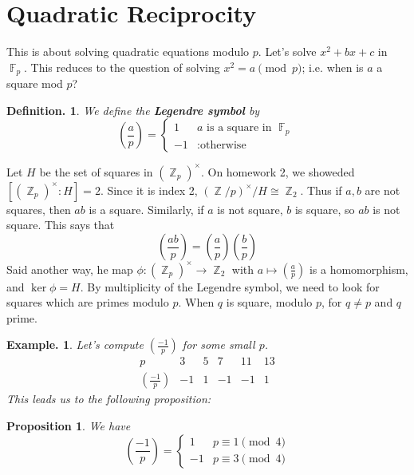 \documentclass[11pt, a4paper]{memoir}
\DeclareMathOperator{\Z}{{\mathbb{Z}}}
\DeclareMathOperator{\F}{{\mathbb{F}}}
\theoremstyle{change}
\newtheorem{proposition}[theorem]{Proposition}
\theoremstyle{plain}
\theoremstyle{nonumberplain}
\newtheorem{definition}{Definition.}
\newtheorem{example}{Example.}
\newcommand{\lgs}[2]{\ensuremath{\left(\frac{#1}{#2}\right)}}
\begin{document}
\section{Quadratic Reciprocity}
This is about solving quadratic equations modulo $p$.
Let's solve $x^2+bx+c$ in $\F_p$.
This reduces to the question of solving $x^2=a\pmod{p}$; i.e. when is $a$ a square mod $p$?
\begin{definition}
    We define the \textbf{Legendre symbol} by
    \begin{equation*}
        \lgs{a}{p}=\begin{cases}1&\text{$a$ is a square in $\F_p$}\\-1&:\text{otherwise}\end{cases}
    \end{equation*}
\end{definition}
Let $H$ be the set of squares in $(\Z_p)^\times$.
On homework 2, we showeded $[(\Z_p)^\times:H]=2$.
Since it is index 2, $(\Z/p)^\times/H\cong\Z_2$.
Thus if $a,b$ are not squares, then $ab$ is a square.
Similarly, if $a$ is not square, $b$ is square, so $ab$ is not square.
This says that
\begin{equation*}
    \lgs{ab}{p}=\lgs{a}{p}\lgs{b}{p}
\end{equation*}
Said another way, he map $\phi:(\Z_p)^\times\to\Z_2$ with $a\mapsto\lgs{a}{p}$ is a homomorphism, and $\ker\phi=H$.
By multiplicity of the Legendre symbol, we need to look for squares which are primes modulo $p$.
When $q$ is square, modulo $p$, for $q\neq p$ and $q$ prime.
\begin{example}
    Let's compute $\lgs{-1}{p}$ for some small $p$.
    \begin{equation*}
        \begin{array}{c|c|c|c|c|c}
            p&3&5&7&11&13\\
            \lgs{-1}{p}&-1&1&-1&-1&1
        \end{array}
    \end{equation*}
    This leads us to the following proposition:
\end{example}
\begin{proposition}
    We have
    \begin{equation*}
        \lgs{-1}{p}=
        \begin{cases}
            1&p\equiv 1\pmod{4}\\
            -1&p\equiv 3\pmod{4}
        \end{cases}
    \end{equation*}
\end{proposition}
\end{document}
